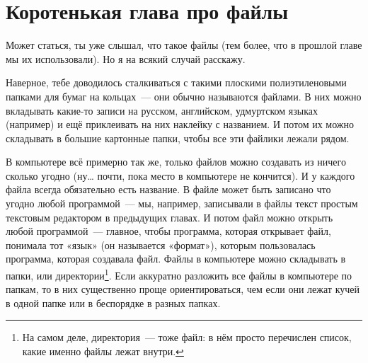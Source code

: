 %
%
%

\chapter{Коротенькая глава про файлы}\label{ch:ashortchapteraboutfiles}

Может статься, ты уже слышал, что такое файлы (тем более, что в прошлой главе мы их использовали). Но я на всякий случай расскажу.

Наверное, тебе доводилось сталкиваться с такими плоскими полиэтиленовыми папками для бумаг на кольцах — они обычно называются файлами. В них можно вкладывать какие-то записи на русском, английском, удмуртском языках (например) и ещё приклеивать на них наклейку с названием. И потом их можно складывать в большие картонные папки, чтобы все эти файлики лежали рядом.

В компьютере всё примерно так же, только файлов можно создавать из ничего сколько угодно (ну… почти, пока место в компьютере не кончится). И у каждого файла всегда обязательно есть название. В файле может быть записано что угодно любой программой — мы, например, записывали в файлы текст простым текстовым редактором в предыдущих главах. И потом файл можно открыть любой программой — главное, чтобы программа, которая открывает файл, понимала тот «язык» (он называется «формат»), которым пользовалась программа, которая создавала файл. Файлы в компьютере можно складывать в папки, или директории\footnote{На самом деле, директория — тоже файл: в нём просто перечислен список, какие именно файлы лежат внутри.}. Если аккуратно разложить все файлы в компьютере по папкам, то в них существенно проще ориентироваться, чем если они лежат кучей в одной папке или в беспорядке в разных папках.

